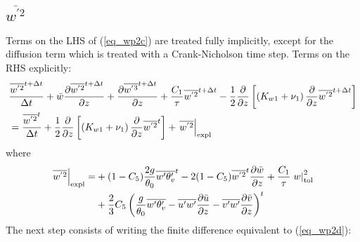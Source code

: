 \documentclass[11pt,fleqn]{article}
\newcommand{\ptlder}[2]{\frac{\partial #1}{\partial #2}}
\begin{document}
\subsection{$\overline{w^{'2}}$}

Terms on the LHS of (\ref{eq_wp2c}) are treated fully implicitly, except
for the diffusion term which is treated with a Crank-Nicholson time step.
Terms on the RHS explicitly:
%
\begin{equation}
\label{eq_wp2d}
\begin{split}
& \frac{\overline{w^{'2}}^{t+\Delta t}}{\Delta t} 
  + \bar{w}\ptlder{\overline{w^{'2}}^{t+\Delta t}}{z}	 
  + \ptlder{\overline{w^{'3}}^{t+\Delta t}}{z} 
  + \dfrac{C_1}{\tau} \overline{w^{'2}}^{t+\Delta t} 
  - \frac{1}{2} \ptlder{}{z} \left[ \left( K_{w1} + \nu_1 \right)
                                    \ptlder{}{z} \overline{w^{'2}}^{t+\Delta t} 
                             \right]  \\
&=
  \frac{\overline{w^{'2}}^{t}}{\Delta t} 
  + \frac{1}{2} \ptlder{}{z} \left[ \left( K_{w1} + \nu_1 \right)
                                    \ptlder{}{z} \overline{w^{'2}}^{t}
                             \right]
  + \left. \overline{w^{'2}} \right|_{\rm expl}
\end{split}
\end{equation}
%
where
%
\begin{equation}
\label{eq_wp2t}
\begin{split}
\left. \overline{w^{'2}} \right|_{\rm expl}
=& 
   + ( 1 - C_5 ) \frac{2g}{\theta_0} \overline{w'\theta'_v}^{t}
   - 2 ( 1 - C_5 ) \overline{w^{'2}}^{t}\ptlder{\bar{w}}{z}
   + \dfrac{C_1}{\tau} \left. w \right|_{\rm{tol}}^{2} \\
 & + \frac{2}{3} C_5
      \left(
        \frac{g}{\theta_0} \overline{w'\theta'_v}
        - \overline{u'w'}\ptlder{\bar{u}}{z} 
        - \overline{v'w'}\ptlder{\bar{v}}{z} 
      \right)^{t}
\end{split}
\end{equation}
%
The next step consists of writing the finite difference equivalent to
(\ref{eq_wp2d}):
%
\end{document}

